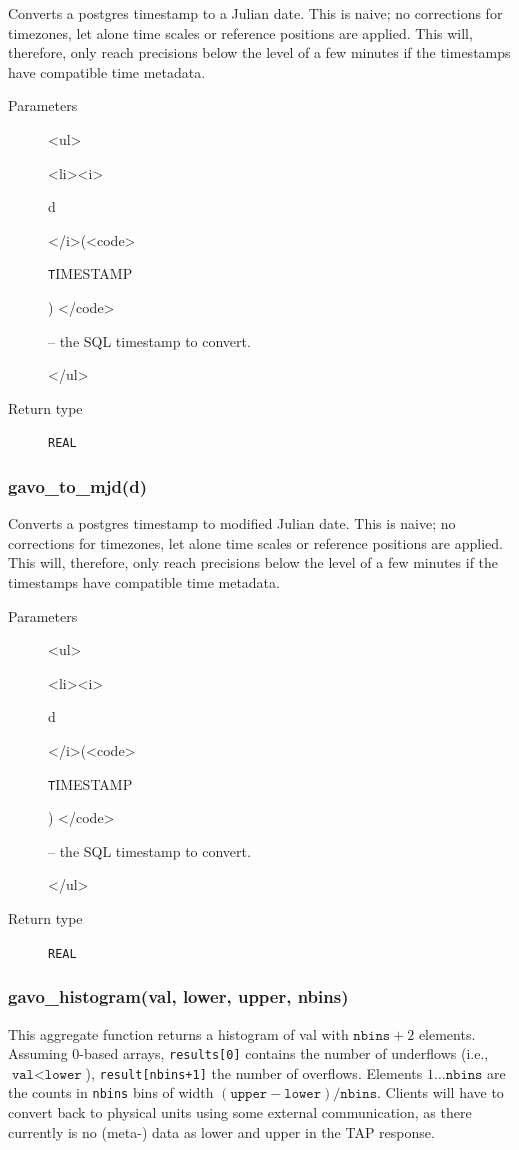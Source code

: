\documentclass[11pt,a4paper]{ivoa}
\newenvironment{args}%
{\begin{html}<ul>\end{html}\def\arg##1(##2){\begin{html}<li><i>\end{html}%
  ##1 \begin{html}</i>(<code>\end{html}##2\begin{html}) </code>\end{html}}}%
{\begin{html}</ul>\end{html}}
\begin{document}
Converts a postgres timestamp to a Julian date. This is naive;
no corrections for timezones, let alone time scales or reference
positions are applied.  This will, therefore, only reach precisions
below the level of a few minutes if the timestamps have compatible time
metadata.

\begin{description}
\item[Parameters]
\begin{args}
	\arg d (\texttt{TIMESTAMP}) -- the SQL timestamp to convert.
\end{args}

\item[Return type] \texttt{REAL}
\end{description}


\subsubsection{gavo\_to\_mjd(d)}

Converts a postgres timestamp to modified Julian date. This is naive; 
no corrections for timezones, let alone time scales or reference
positions are applied.  This will, therefore, only reach precisions
below the level of a few minutes if the timestamps have compatible time
metadata.

\begin{description}
\item[Parameters]
\begin{args}
	\arg d (\texttt{TIMESTAMP}) -- the SQL timestamp to convert.
\end{args}

\item[Return type] \texttt{REAL}
\end{description}


\subsubsection{gavo\_histogram(val, lower, upper, nbins)}

This aggregate function returns a histogram of val with
$\texttt{nbins}+2$ elements.  Assuming 0-based arrays, \verb|results[0]|
contains the number of underflows (i.e., $\texttt{val}<\texttt{lower}$),
\verb|result[nbins+1]| the number of overflows. Elements
$1\ldots\texttt{nbins}$ are the counts in \texttt{nbins} bins of width
$(\texttt{upper}-\texttt{lower})/\texttt{nbins}$.  Clients will have to
convert back to physical units using some external communication, as there
currently is no (meta-) data as lower and upper in the TAP response.
\end{document}
